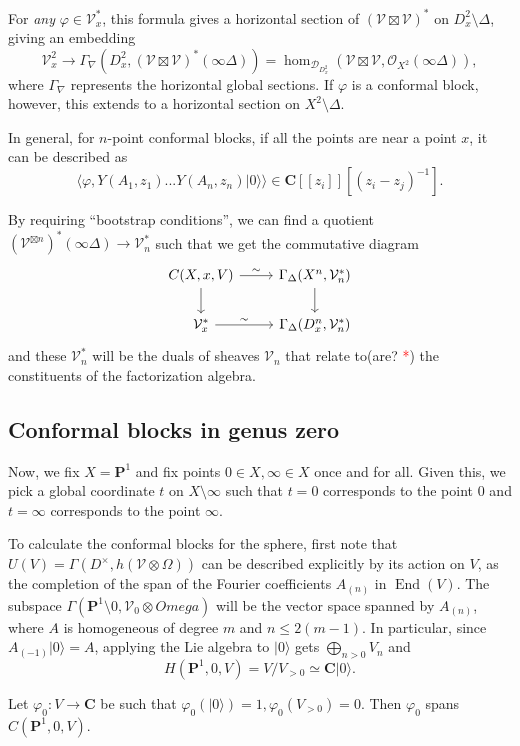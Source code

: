 \documentclass{article}
\newcommand{\CC}{\mathbold{C}}
\newcommand{\PP}{\mathbold{P}}
\newcommand{\vac}{|0\rangle}
\newcommand{\Oo}{\mathcal{O}}
\newcommand{\Dd}{\mathcal{D}}
\newcommand{\Vv}{\mathcal{V}}
\newcommand{\tk}{\textcolor{red}{*}}
\DeclareMathOperator{\End}{End}
\begin{document}
For \textit{any} $\varphi \in \Vv_x^*$, this formula gives a horizontal section of $(\Vv \boxtimes \Vv)^*$ on $D_x^2 \setminus \Delta$, giving an embedding
\[\Vv_x^2 \rightarrow \Gamma_\nabla(D_x^2,(\Vv \boxtimes \Vv)^*(\infty \Delta))=\hom_{\Dd_{D_x^2}}(\Vv \boxtimes \Vv,\Oo_{X^2}(\infty \Delta)), \]
where $\Gamma_\nabla$ represents the horizontal global sections.  If $\varphi$ is a conformal block, however, this extends to a horizontal section on $X^2 \setminus \Delta$.

In general, for $n$-point conformal blocks, if all the points are near a point $x$, it can be described as
\[\langle \varphi, Y(A_1,z_1)...Y(A_n,z_n)\vac \rangle \in \CC[[z_i]][(z_i-z_j)^{-1}]. \]

By requiring ``bootstrap conditions'', we can find a quotient $(\Vv^{\boxtimes n})^*(\infty \Delta) \rightarrow \Vv^*_n$ such that we get the commutative diagram
\[
  \begin{tikzcd}
    C(X,x,V) \arrow[r,"\sim"] \arrow[d] & \Gamma_\Delta(X^n,\Vv_n^*) \arrow[d]\\
    \Vv_x^* \arrow[r,"\sim"] & \Gamma_\Delta(D_x^n,\Vv_n^*)
  \end{tikzcd}
\]
and these $\Vv_n^*$ will be the duals of sheaves $\Vv_n$ that relate to(are? \tk) the constituents of the factorization algebra.

\subsection{Conformal blocks in genus zero}
Now, we fix $X=\PP^1$ and fix points $0 \in X, \infty \in X$ once and for all.  Given this, we pick a global coordinate $t$ on $X \setminus \infty$ such that $t=0$ corresponds to the point $0$ and $t=\infty$ corresponds to the point $\infty$.

To calculate the conformal blocks for the sphere, first note that $U(V)=\Gamma(D^\times,h(\Vv \otimes \Omega))$ can be described explicitly by its action on $V$, as the completion of the span of the Fourier coefficients $A_{(n)}$ in $\End(V)$.  The subspace $\Gamma(\PP^1 \setminus 0,\Vv_0 \otimes Omega)$ will be the vector space spanned by $A_{(n)}$, where $A$ is homogeneous of degree $m$ and $n \le 2(m-1)$.  In particular, since $A_{(-1)}\vac=A$, applying the Lie algebra to $\vac$ gets $\bigoplus_{n>0}V_n$ and
\[H(\PP^1,0,V)=V/V_{>0}\simeq \CC \vac. \]

Let $\varphi_0:V \rightarrow \CC$ be such that $\varphi_0(\vac)=1, \varphi_0(V_{>0})=0$.  Then $\varphi_0$ spans $C(\PP^1,0,V)$.
\end{document}
